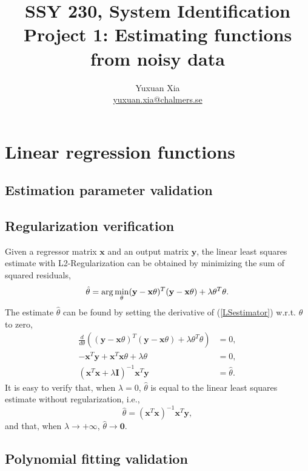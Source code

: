 \documentclass[]{article}
\title{SSY 230, System Identification\\
	Project 1: Estimating functions from noisy data}
\author{Yuxuan Xia\\ \href{mailto:yuxuan.xia@chalmers.se}{yuxuan.xia@chalmers.se}}
\begin{document}
\maketitle

\section{Linear regression functions}

\subsection{Estimation parameter validation}

\subsection{Regularization verification}

Given a regressor matrix $\mathbf{x}$ and an output matrix $\mathbf{y}$, the linear least squares estimate with L2-Regularization can be obtained by minimizing the sum of squared residuals,
\begin{equation}{\label{LSestimator}}
\hat{\theta} = \arg\min\limits_{\theta}(\mathbf{y}-\mathbf{x}\theta)^T(\mathbf{y}-\mathbf{x}\theta)+\lambda\theta^T\theta.
\end{equation}
The estimate $\hat{\theta}$ can be found by setting the derivative of (\ref{LSestimator}) w.r.t. $\theta$ to zero,
\begin{subequations}\label{LSderivative}
		\begin{align}
		\frac{d}{d\theta}\left((\mathbf{y}-\mathbf{x}\theta)^T(\mathbf{y}-\mathbf{x}\theta)+\lambda\theta^T\theta \right) &= 0,\\
		-\mathbf{x}^T\mathbf{y}+\mathbf{x}^T\mathbf{x}\theta+\lambda\theta &=0,\\
		(\mathbf{x}^T\mathbf{x}+\lambda\mathbf{I})^{-1}\mathbf{x}^T\mathbf{y} &=\hat{\theta}.
		\end{align}
\end{subequations}
It is easy to verify that, when $\lambda=0$, $\hat{\theta}$ is equal to the linear least squares estimate without regularization, i.e.,
\begin{equation}
\hat{\theta} = (\mathbf{x}^T\mathbf{x})^{-1}\mathbf{x}^T\mathbf{y},
\end{equation}
and that, when $\lambda\rightarrow +\infty$, $\hat{\theta}\rightarrow \mathbf{0}$.


\subsection{Polynomial fitting validation}
\end{document}
